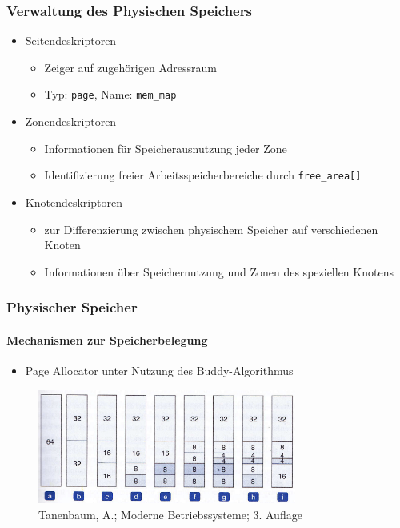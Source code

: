 \documentclass[ddcfooter,nosectionnum]{tudbeamer}
\begin{document}
\begin{frame}
	\frametitle{Verwaltung des Physischen Speichers}
    \begin{itemize}
    	\item Seitendeskriptoren
        \begin{itemize}
			\item Zeiger auf zugehörigen Adressraum
			\item Typ: \texttt{page}, Name: \texttt{mem\_map}
       	\end{itemize}
		\item Zonendeskriptoren
		\begin{itemize}
			\item Informationen für Speicherausnutzung jeder Zone
			\item Identifizierung freier Arbeitsspeicherbereiche durch
			\texttt{free\_area[]}
		\end{itemize}
		\item Knotendeskriptoren
		\begin {itemize}
			\item zur Differenzierung zwischen physischem Speicher auf verschiedenen Knoten	
			\item Informationen über Speichernutzung und Zonen des speziellen Knotens
		\end {itemize}			
   	\end{itemize} 

   
       
\end{frame}

\begin{frame}
\frametitle{Physischer Speicher}
\framesubtitle{Mechanismen zur Speicherbelegung}
	\begin{itemize}
		\item Page Allocator unter Nutzung des Buddy-Algorithmus
	\end{itemize}
	\begin{figure}[p] 
		\includegraphics[width=8.5cm]{buddy.png}
		\caption{ Tanenbaum, A.; Moderne Betriebssysteme; 3. Auflage}
\end{figure} 
	
\end{frame}	
\end{document}
